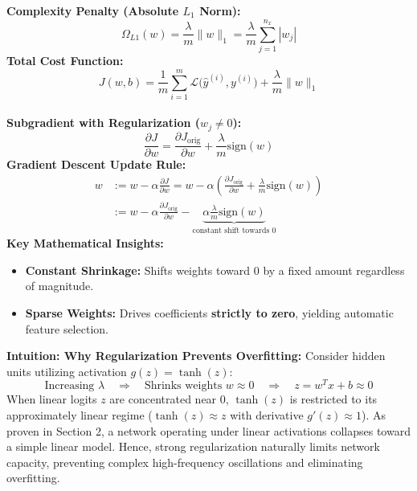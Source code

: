 \documentclass[10pt,a4paper]{article}
\begin{document}
\begin{minipage}[t]{0.485\textwidth}
\begin{tcolorbox}[
    colframe=accentred, colback=white, coltitle=white,
    fonttitle=\bfseries\sffamily\small,
    title={$L_1$ Regularization (Lasso / Sparsity)},
    arc=1.3mm, boxrule=0.5pt, left=4pt, right=4pt, top=2pt, bottom=2pt
]
\footnotesize
\textbf{Complexity Penalty (Absolute $L_1$ Norm):}
\[
\Omega_{L1}(w) = \frac{\lambda}{m} \|w\|_1 = \frac{\lambda}{m} \sum_{j=1}^{n_x} |w_j|
\]
\textbf{Total Cost Function:}
\[
J(w, b) = \frac{1}{m}\sum_{i=1}^m \mathcal{L}\big(\hat{y}^{(i)}, y^{(i)}\big) + \frac{\lambda}{m} \|w\|_1
\]
\hrulefill\\[1pt]
\textbf{Subgradient with Regularization ($w_j \neq 0$):}
\[
\frac{\partial J}{\partial w} = \frac{\partial J_{\text{orig}}}{\partial w} + \frac{\lambda}{m} \text{sign}(w)
\]
\textbf{Gradient Descent Update Rule:}
\begin{align*}
w &:= w - \alpha \frac{\partial J}{\partial w} = w - \alpha \left(\frac{\partial J_{\text{orig}}}{\partial w} + \frac{\lambda}{m} \text{sign}(w)\right) \\[2pt]
&:= w - \alpha \frac{\partial J_{\text{orig}}}{\partial w} - \underbrace{\alpha \frac{\lambda}{m} \text{sign}(w)}_{\text{constant shift towards } 0}
\end{align*}
\textbf{Key Mathematical Insights:}
\begin{itemize}[leftmargin=7pt, itemsep=0.5pt]
    \item \textbf{Constant Shrinkage:} Shifts weights toward 0 by a fixed amount regardless of magnitude.
    \item \textbf{Sparse Weights:} Drives coefficients \textbf{strictly to zero}, yielding automatic feature selection.
\end{itemize}
\end{tcolorbox}
\end{minipage}

\vspace{1pt}

\begin{tcolorbox}[
    colframe=themeblue, colback=lightbg, arc=1.3mm, boxrule=0.5pt,
    left=5pt, right=5pt, top=2pt, bottom=2pt
]
\footnotesize
\textbf{Intuition: Why Regularization Prevents Overfitting:}
Consider hidden units utilizing activation $g(z) = \tanh(z)$:
\[
\text{Increasing } \lambda \quad\Longrightarrow\quad \text{Shrinks weights } w \approx 0 \quad\Longrightarrow\quad z = w^T x + b \approx 0
\]
When linear logits $z$ are concentrated near $0$, $\tanh(z)$ is restricted to its approximately linear regime ($\tanh(z) \approx z$ with derivative $g'(z) \approx 1$). As proven in Section 2, a network operating under linear activations collapses toward a simple linear model. Hence, strong regularization naturally limits network capacity, preventing complex high-frequency oscillations and eliminating overfitting.
\end{tcolorbox}
\end{document}
